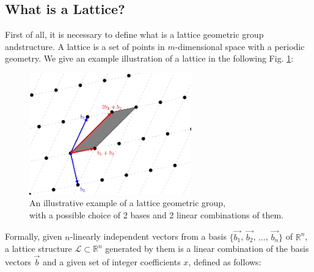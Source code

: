 \documentclass[runningheads]{llncs}
\numberwithin{equation}{section}
\begin{document}
    \newpage
    
    \subsection{What is a Lattice?}
    \label{subsec:what-is-a-lattice}

    First of all, it is necessary to define what is a lattice geometric group and\break structure. A lattice is a set of points in $m$-dimensional space with a periodic geometry. We give an example illustration of a lattice in the following Fig. \ref{fig:lattice-structure-illustrative-example}: 

    \vspace{-2ex}
    \begin{figure}[!ht]
        \centering
        \captionsetup{justification=centering}
        \includegraphics[width=0.625\textwidth]{figures/sections/section-2/lattice-structure-illustrative-example.pdf}
        \caption{An illustrative example of a lattice geometric group,\\ with a possible choice of 2 bases and 2 linear combinations of them.}
        \label{fig:lattice-structure-illustrative-example}
    \end{figure}
    
    \noindent Formally, given $n$-linearly independent vectors from a basis $\{\Vec{{b}_{1}}$, $\Vec{{b}_{2}}$, $\dots$, $\Vec{{b}_{n}}\}$ of ${\mathbb{R}}^{n}$, a lattice structure $\mathcal{L} \subset {\mathbb{R}^{n}}$ generated by them is a linear combination of the basis vectors $\Vec{b}$ and a given set of integer coefficients $x$, defined as follows:
    
\end{document}
